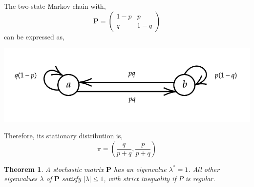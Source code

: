 \documentclass{tufte-handout}
\newtheorem{thm}{Theorem}
\begin{document}
  \begin{marginfigure}
    The two-state Markov chain with,
    \[\boldsymbol{P}=\left(\begin{array}{cc}1-p & p \\ q & 1-q\end{array}\right)\]
    \noindent can be expressed as,
    \begin{center}
    \includegraphics[width=\textwidth]{fig-13.png}
    \end{center}
    \noindent Therefore, its stationary distribution is,
    \[\pi=\left(\frac{q}{p+q}, \frac{p}{p+q}\right)\]
  \end{marginfigure}


  \begin{thm}
    A stochastic matrix $\boldsymbol{P}$ has an eigenvalue $\lambda^* = 1$. All other eigenvalues $\lambda$ of $\boldsymbol{P}$ satisfy $|\lambda| \leq 1$, with strict inequality if $P$ is regular.
    \label{perronlemma}
  \end{thm}
\end{document}
